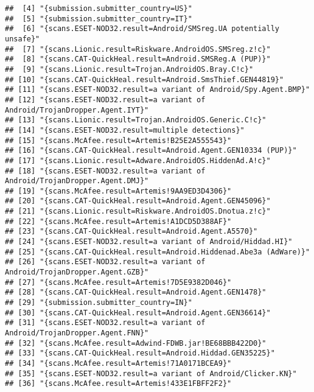 \documentclass[
]{book}
\begin{document}
\begin{verbatim}
##  [4] "{submission.submitter_country=US}"                                     
##  [5] "{submission.submitter_country=IT}"                                     
##  [6] "{scans.ESET-NOD32.result=Android/SMSreg.UA potentially unsafe}"        
##  [7] "{scans.Lionic.result=Riskware.AndroidOS.SMSreg.z!c}"                   
##  [8] "{scans.CAT-QuickHeal.result=Android.SMSReg.A (PUP)}"                   
##  [9] "{scans.Lionic.result=Trojan.AndroidOS.Bray.C!c}"                       
## [10] "{scans.CAT-QuickHeal.result=Android.SmsThief.GEN44819}"                
## [11] "{scans.ESET-NOD32.result=a variant of Android/Spy.Agent.BMP}"          
## [12] "{scans.ESET-NOD32.result=a variant of Android/TrojanDropper.Agent.IYT}"
## [13] "{scans.Lionic.result=Trojan.AndroidOS.Generic.C!c}"                    
## [14] "{scans.ESET-NOD32.result=multiple detections}"                         
## [15] "{scans.McAfee.result=Artemis!B25E2A555543}"                            
## [16] "{scans.CAT-QuickHeal.result=Android.Agent.GEN10334 (PUP)}"             
## [17] "{scans.Lionic.result=Adware.AndroidOS.HiddenAd.A!c}"                   
## [18] "{scans.ESET-NOD32.result=a variant of Android/TrojanDropper.Agent.DMJ}"
## [19] "{scans.McAfee.result=Artemis!9AA9ED3D4306}"                            
## [20] "{scans.CAT-QuickHeal.result=Android.Agent.GEN45096}"                   
## [21] "{scans.Lionic.result=Riskware.AndroidOS.Dnotua.z!c}"                   
## [22] "{scans.McAfee.result=Artemis!A1DCD5D388AF}"                            
## [23] "{scans.CAT-QuickHeal.result=Android.Agent.A5570}"                      
## [24] "{scans.ESET-NOD32.result=a variant of Android/Hiddad.HI}"              
## [25] "{scans.CAT-QuickHeal.result=Android.Hiddenad.Abe3a (AdWare)}"          
## [26] "{scans.ESET-NOD32.result=a variant of Android/TrojanDropper.Agent.GZB}"
## [27] "{scans.McAfee.result=Artemis!7D5E9382D046}"                            
## [28] "{scans.CAT-QuickHeal.result=Android.Agent.GEN1478}"                    
## [29] "{submission.submitter_country=IN}"                                     
## [30] "{scans.CAT-QuickHeal.result=Android.Agent.GEN36614}"                   
## [31] "{scans.ESET-NOD32.result=a variant of Android/TrojanDropper.Agent.FNN}"
## [32] "{scans.McAfee.result=Adwind-FDWB.jar!BE68BBB422D0}"                    
## [33] "{scans.CAT-QuickHeal.result=Android.Hiddad.GEN35225}"                  
## [34] "{scans.McAfee.result=Artemis!71A0171BCEA9}"                            
## [35] "{scans.ESET-NOD32.result=a variant of Android/Clicker.KN}"             
## [36] "{scans.McAfee.result=Artemis!433E1FBFF2F2}"
\end{verbatim}
\end{document}
